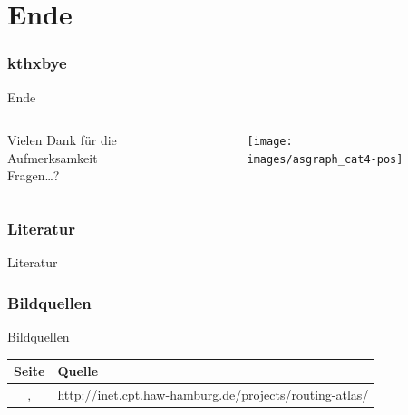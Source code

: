 \documentclass[ngerman,compress,hyperref={bookmarks}]{beamer}
\begin{document}
\part{Ende}
\section{kthxbye}
\begin{frame}[plain]{Ende}
\begin{columns}[t]
\begin{column}{0.5\textwidth}
 \begin{center}
 \vspace{1cm}
 Vielen Dank für die Aufmerksamkeit\\
 \vspace{1.5cm}
 Fragen\ldots?
 \end{center}
\end{column}
\begin{column}{0.5\textwidth}
 \vspace{-1cm}
 \begin{figure}
  \label{asngraphs2}
  \texttt{[image: images/asgraph\_cat4-pos]}
 \end{figure}
\end{column}
\end{columns}
\end{frame}

\section{Literatur}
\begin{frame}{Literatur}
\scriptsize


\end{frame}

\section{Bildquellen}
\begin{frame}[plain]{Bildquellen}
  \scriptsize
  \begin{table}
    \begin{tabular}{ c p{} }
      Seite & Quelle \\ \hline
      \pageref{asgraphs}, \pageref{asngraphs2} & \url{http://inet.cpt.haw-hamburg.de/projects/routing-atlas/}\\ \hline
    \end{tabular}
  \end{table}
\end{frame}
\end{document}
